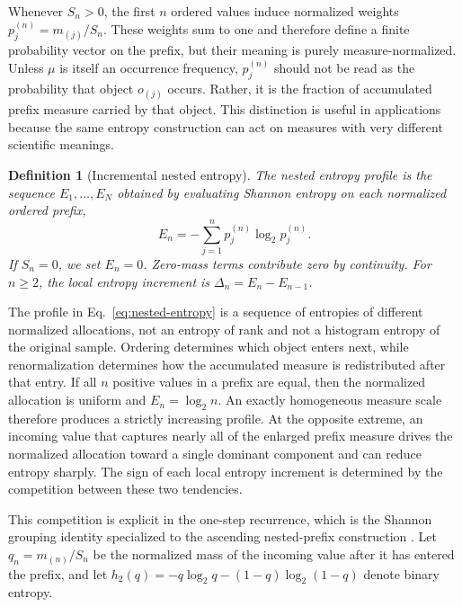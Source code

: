 \documentclass[10pt,a4paper]{amsart}
\newtheorem{theorem}{Theorem}
\newtheorem{definition}[theorem]{Definition}
\begin{document}
Whenever \(S_n>0\), the first \(n\) ordered values induce normalized weights \(p_j^{(n)}=m_{(j)}/S_n\). These weights sum to one and therefore define a finite probability vector on the prefix, but their meaning is purely measure-normalized. Unless \(\mu\) is itself an occurrence frequency, \(p_j^{(n)}\) should not be read as the probability that object \(o_{(j)}\) occurs. Rather, it is the fraction of accumulated prefix measure carried by that object. This distinction is useful in applications because the same entropy construction can act on measures with very different scientific meanings.

\begin{definition}[Incremental nested entropy]
\label{def:nested}
The nested entropy profile is the sequence \(E_1,\ldots,E_N\) obtained by evaluating Shannon entropy on each normalized ordered prefix,
\begin{equation}
E_n=-\sum_{j=1}^{n}p_j^{(n)}\log_2 p_j^{(n)}.
\label{eq:nested-entropy}
\end{equation}
If \(S_n=0\), we set \(E_n=0\). Zero-mass terms contribute zero by continuity. For \(n\ge2\), the local entropy increment is \(\Delta_n=E_n-E_{n-1}\).
\end{definition}

The profile in Eq.~\eqref{eq:nested-entropy} is a sequence of entropies of different normalized allocations, not an entropy of rank and not a histogram entropy of the original sample. Ordering determines which object enters next, while renormalization determines how the accumulated measure is redistributed after that entry. If all \(n\) positive values in a prefix are equal, then the normalized allocation is uniform and \(E_n=\log_2 n\). An exactly homogeneous measure scale therefore produces a strictly increasing profile. At the opposite extreme, an incoming value that captures nearly all of the enlarged prefix measure drives the normalized allocation toward a single dominant component and can reduce entropy sharply. The sign of each local entropy increment is determined by the competition between these two tendencies.

This competition is explicit in the one-step recurrence, which is the Shannon grouping identity specialized to the ascending nested-prefix construction \cite{shannon1948,coverthomas2006}. Let \(q_n=m_{(n)}/S_n\) be the normalized mass of the incoming value after it has entered the prefix, and let \(h_2(q)=-q\log_2q-(1-q)\log_2(1-q)\) denote binary entropy.

\end{document}
